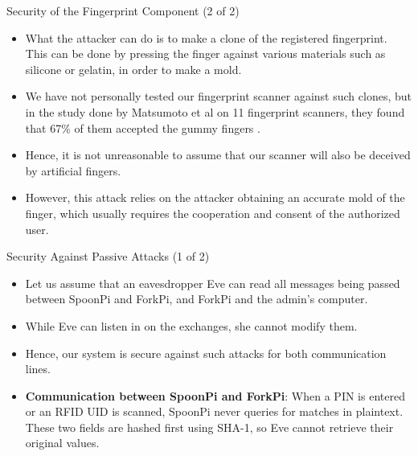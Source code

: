\begin{frame}{Security of the Fingerprint Component (2 of 2)}
\begin{itemize}
    \item<1-> What the attacker can do is to make a clone of the registered fingerprint. This can be done by pressing the finger against various materials such as silicone or gelatin, in order to make a mold.
    \item<2->  We have not personally tested our fingerprint scanner against such clones, but in the study done by Matsumoto et al on 11 fingerprint scanners, they found that 67\% of them accepted the gummy fingers .
    \item<3-> Hence, it is not unreasonable to assume that our scanner will also be deceived by artificial fingers.
    \item<4-> However, this attack relies on the attacker obtaining an accurate mold of the finger, which usually requires the cooperation and consent of the authorized user.
\end{itemize}
\end{frame}

\begin{frame}{Security Against Passive Attacks (1 of 2)}
\begin{itemize}
    \item<1-> Let us assume that an eavesdropper Eve can read all messages being passed between SpoonPi and ForkPi, and ForkPi and the admin’s computer.
    \item<2-> While Eve can listen in on the exchanges, she cannot modify them.
    \item<3-> Hence, our system is secure against such attacks for both communication lines.
    \item<4-> \textbf{Communication between SpoonPi and ForkPi}: When a PIN is entered or an RFID UID is scanned, SpoonPi never queries for matches in plaintext. These two fields are hashed first using SHA-1, so Eve cannot retrieve their original values.
\end{itemize}
\end{frame}

